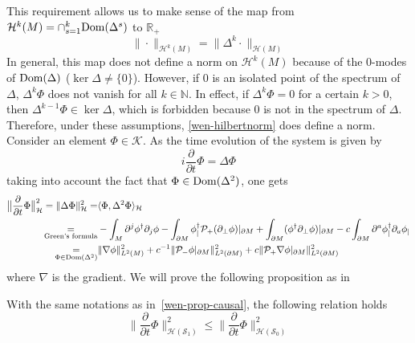 This requirement allows us to make sense of the map
from $\mathcal{H}^k(M) = \cap_{s=1}^{k} \mathrm{Dom}(\Delta^s)$ to $\mathbb{R}_+$
\begin{equation}\label{wen-hilbertnorm}
\| \cdot \|_{\mathcal{H}^k(M)} = \| \Delta^k \cdot \|_{\mathcal{H}(M)}
\end{equation}
In general, this map does not define a norm on $\mathcal{H}^k(M)$ because of the 0-modes of $\mathrm{Dom}(\Delta)$ ($\ker \Delta \neq \{0\}$).
However, 
if 0 is an isolated point of the spectrum of $\Delta$, $\Delta^k \Phi$ does not vanish for all $k\in\mathbb{N}$.
In effect, 
if $\Delta^k \Phi = 0$ for a certain $k>0$,
then $\Delta^{k-1}\Phi\in\ker\Delta$, which is forbidden because $0$ is not in the spectrum of $\Delta$.
Therefore, under these assumptions, 
\cref{wen-hilbertnorm} does define a norm.
%
Consider an element $\Phi \in \mathcal{K}$.
As the time evolution of the system is given by
\begin{equation*}
i \frac{\partial }{\partial t} \Phi = \Delta \Phi 
\end{equation*}
taking into account the fact that $\Phi\in\mathrm{Dom}(\Delta^2)$, one gets
\begin{equation}\label{wen-tobebounded}
\begin{split}
\big\| \frac{\partial }{\partial t} \Phi \big\|^2_\mathcal{H} = \| \Delta \Phi \|^2_{\mathcal{H}}  = &
\langle \Phi, \Delta^2 \Phi \rangle_{\mathcal{H}}   \\ 
\underset{\textrm{Green's formula}}=
& - \int_M \partial^j \phi^\dagger \partial_j \phi 
 -  \int_{\partial M}\phi_|^\dagger \mathcal{P}_+(\partial_\bot \phi)\vert_{\partial M} 
 + \int_{\partial M} (\phi^\dagger \partial_\bot\phi)\vert_{\partial M}
- c\int_{\partial M} \partial^a \phi^\dagger_| \partial_a \phi_| \\
\underset{\Phi \in \mathrm{Dom}(\Delta^2)}{=} &
\|\nabla \phi \|^2_{L^2 (M)} + c^{-1} \| \mathcal{P}_- \phi\vert_{\partial M} \|^2_{L^2(\partial M)}
+ c \| \mathcal{P}_+ \nabla \phi\vert_{\partial M} \|^2_{L^2(\partial M)}
\end{split}
\end{equation}
where $\nabla$ is the gradient.
We will prove the following proposition as in~\cite{Zahn2016}
\begin{proposition}\label{wen-propcau}
With the same notations as in~\cref{wen-prop-causal},
the following relation holds
\begin{equation}\label{wen-causal}
\big\| \frac{\partial}{\partial t} \Phi \big\|_{\mathcal{H}(\mathcal{S}_1)}^2
\leq 
\big\| \frac{\partial}{\partial t} \Phi \big\|_{\mathcal{H}(\mathcal{S}_0)}^2
\end{equation}
\end{proposition}
